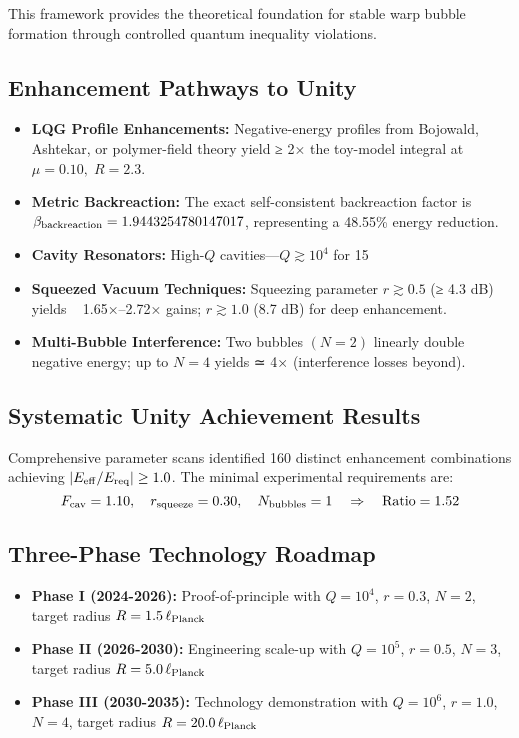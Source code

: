 \documentclass[11pt]{article}
\begin{document}
This framework provides the theoretical foundation for stable warp bubble formation through controlled quantum inequality violations.

\subsection*{Enhancement Pathways to Unity}
\begin{itemize}
  \item \textbf{LQG Profile Enhancements:} Negative-energy profiles from Bojowald, Ashtekar, or polymer-field theory yield ≥ 2× the toy-model integral at \(\mu=0.10,\;R=2.3\).    \item \textbf{Metric Backreaction:} The exact self-consistent backreaction factor is
    \(\beta_{\rm backreaction} = 1.9443254780147017\), representing a 48.55\% energy reduction.
  \item \textbf{Cavity Resonators:} High-\(Q\) cavities—\(Q\gtrsim10^4\) for 15 %
  \item \textbf{Squeezed Vacuum Techniques:} Squeezing parameter \(r\gtrsim0.5\) (≥ 4.3 dB) yields ~ 1.65×–2.72× gains; \(r\gtrsim1.0\) (8.7 dB) for deep enhancement.  
  \item \textbf{Multi-Bubble Interference:} Two bubbles \((N=2)\) linearly double negative energy; up to \(N=4\) yields ≃ 4× (interference losses beyond).  
\end{itemize}

\subsection*{Systematic Unity Achievement Results}
Comprehensive parameter scans identified 160 distinct enhancement combinations achieving $|E_{\rm eff}/E_{\rm req}| \geq 1.0$. The minimal experimental requirements are:
\begin{equation}
F_{\rm cav} = 1.10, \quad r_{\rm squeeze} = 0.30, \quad N_{\rm bubbles} = 1 \quad \Rightarrow \quad \text{Ratio} = 1.52
\end{equation}

\subsection*{Three-Phase Technology Roadmap}
\begin{itemize}
\item \textbf{Phase I (2024-2026):} Proof-of-principle with $Q=10^4$, $r=0.3$, $N=2$, target radius $R=1.5\,\ell_{\rm Planck}$
\item \textbf{Phase II (2026-2030):} Engineering scale-up with $Q=10^5$, $r=0.5$, $N=3$, target radius $R=5.0\,\ell_{\rm Planck}$ 
\item \textbf{Phase III (2030-2035):} Technology demonstration with $Q=10^6$, $r=1.0$, $N=4$, target radius $R=20.0\,\ell_{\rm Planck}$
\end{itemize}
\end{document}
